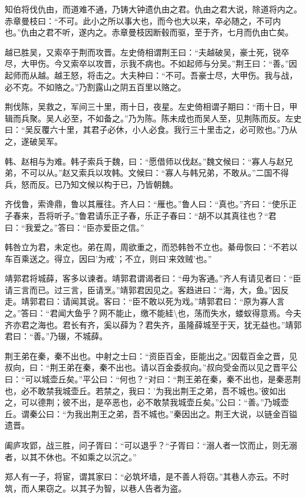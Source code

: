 \documentclass[]{article}
\begin{document}
知伯将伐仇由，而道难不通，乃铸大钟遗仇由之君。仇由之君大说，除道将内之。赤章曼枝曰：``不可。此小之所以事大也，而今也大以来，卒必随之，不可内也。''仇由之君不听，遂内之。赤章曼枝因断毂而驱，至于齐，七月而仇由亡矣。

越已胜吴，又索卒于荆而攻晋。左史倚相谓荆王曰：``夫越破吴，豪士死，锐卒尽，大甲伤。今又索卒以攻晋，示我不病也。不如起师与分吴。''荆王曰：``善。''因起师而从越。越王怒，将击之。大夫种曰：``不可。吾豪士尽，大甲伤。我与战，必不克。不如赂之。''乃割露山之阴五百里以赂之。

荆伐陈，吴救之，军间三十里，雨十日，夜星。左史倚相谓子期曰：``雨十日，甲辑而兵聚。吴人必至，不如备之。''乃为陈。陈未成也而吴人至，见荆陈而反。左史曰：``吴反覆六十里，其君子必休，小人必食。我行三十里击之，必可败也。''乃从之，遂破吴军。

韩、赵相与为难。韩子索兵于魏，曰：``愿借师以伐赵。''魏文候曰：``寡人与赵兄弟，不可以从。''赵又索兵以攻韩。文候曰：``寡人与韩兄弟，不敢从。''二国不得兵，怒而反。已乃知文候以构于已，乃皆朝魏。

齐伐鲁，索谗鼎，鲁以其雁往。齐人曰：``雁也。''鲁人曰：``真也。''齐曰：``使乐正子春来，吾将听子。''鲁君请乐正子春，乐正子春曰：``胡不以其真往也？``君曰：``我爱之。''答曰：``臣亦爱臣之信。''

韩咎立为君，未定也。弟在周，周欲重之，而恐韩咎不立也。綦毋恢曰：``不若以车百乘送之。得立，因曰'为戒'；不立，则曰'来效贼'也。''

靖郭君将城薛，客多以谏者。靖郭君谓谒者曰：``毋为客通。''齐人有请见者曰：``臣请三言而已。过三言，臣请烹。''靖郭君因见之。客趋进曰：``海，大，鱼。''因反走。靖郭君曰：请闻其说。客曰：``臣不敢以死为戏。''靖郭君曰：``原为寡人言之。''答曰：``君闻大鱼乎？网不能止，缴不能絓\textbackslash{}也，荡而失水，蝼蚁得意焉。今夫齐亦君之海也。君长有齐，奚以薛为？君失齐，虽隆薛城至于天，犹无益也。''靖郭君曰：``善。''乃辍，不城薛。

荆王弟在秦，秦不出也。中射之士曰：``资臣百金，臣能出之。''因载百金之晋，见叔向，曰：``荆王弟在秦，秦不出也。请以百金委叔向。''叔向受金而以见之晋平公曰：``可以城壶丘矣。''平公曰：``何也？``对曰：``荆王弟在秦，秦不出也，是秦恶荆也，必不敢禁我城壶丘。若禁之，我曰：'为我出荆王之弟，吾不城也。'彼如出之，可以德荆；彼不出，是卒恶也，必不敢禁我城壶丘矣。''公曰：``善。''乃城壶丘。谓秦公曰：``为我出荆王之弟，吾不城也。''秦因出之。荆王大说，以链金百镒遗晋。

阖庐攻郢，战三胜，问子胥曰：``可以退乎？``子胥曰：``溺人者一饮而止，则无溺者，以其不休也。不如乘之以沉之。''

郑人有一子，将宦，谓其家曰：``必筑坏墙，是不善人将窃。''其巷人亦云。不时筑，而人果窃之。以其子为智，以巷人告者为盗。
\end{document}
